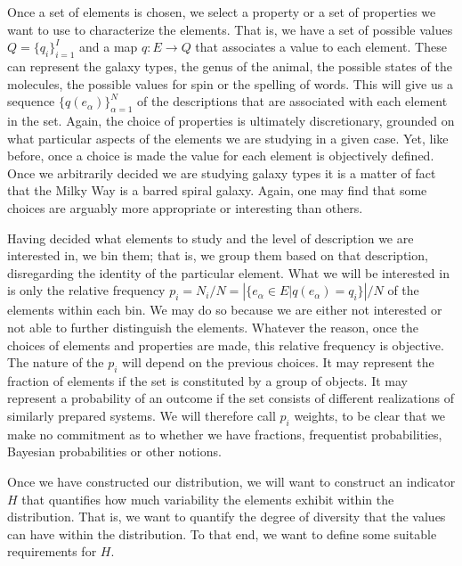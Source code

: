 \documentclass{article}
\begin{document}
Once a set of elements is chosen, we select a property or a set of properties we want to use to characterize the elements. That is, we have a set of possible values $Q=\{q_i\}_{i=1}^I$ and a map $q : E \to Q$ that associates a value to each element. These can represent the galaxy types, the genus of the animal, the possible states of the molecules, the possible values for spin or the spelling of words. This will give us a sequence $\{q(e_\alpha)\}_{\alpha=1}^N$ of the descriptions that are associated with each element in the set. Again, the choice of properties is ultimately discretionary, grounded on what particular aspects of the elements we are studying in a given case. Yet, like before, once a choice is made the value for each element is objectively defined. Once we arbitrarily decided we are studying galaxy types it is a matter of fact that the Milky Way is a barred spiral galaxy. Again, one may find that some choices are arguably more appropriate or interesting than others.

Having decided what elements to study and the level of description we are interested in, we bin them; that is, we group them based on that description, disregarding the identity of the particular element. What we will be interested in is only the relative frequency $p_i = N_i / N = \left| \{e_\alpha \in E | q(e_\alpha) = q_i \} \right| / N$ of the elements within each bin. We may do so because we are either not interested or not able to further distinguish the elements. Whatever the reason, once the choices of elements and properties are made, this relative frequency is objective. The nature of the $p_i$ will depend on the previous choices. It may represent the fraction of elements if the set is constituted by a group of objects. It may represent a probability of an outcome if the set consists of different realizations of similarly prepared systems. We will therefore call $p_i$ weights, to be clear that we make no commitment as to whether we have fractions, frequentist probabilities, Bayesian probabilities or other notions.

Once we have constructed our distribution, we will want to construct an indicator $H$ that quantifies how much variability the elements exhibit within the distribution. That is, we want to quantify the degree of diversity that the values can have within the distribution. To that end, we want to define some suitable requirements for $H$.
\end{document}
